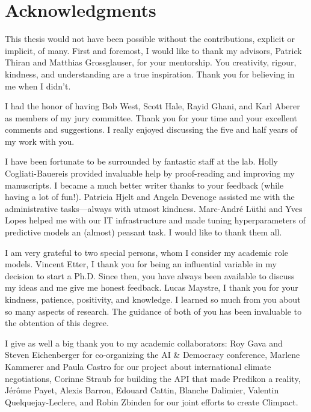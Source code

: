\chapter*{Acknowledgments}

This thesis would not have been possible without the contributions, explicit or implicit, of many.
First and foremost, I would like to thank my advisors, Patrick Thiran and Matthias Grossglauser, for your mentorship.
You creativity, rigour, kindness, and understanding are a true inspiration.
Thank you for believing in me when I didn't.

I had the honor of having Bob West, Scott Hale, Rayid Ghani, and Karl Aberer as members of my jury committee.
Thank you for your time and your excellent comments and suggestions.
I really enjoyed discussing the five and half years of my work with you.

I have been fortunate to be surrounded by fantastic staff at the lab.
Holly Cogliati-Bauereis provided invaluable help by proof-reading and improving my manuscripts.
I became a much better writer thanks to your feedback (while having a lot of fun!).
Patricia Hjelt and Angela Devenoge assisted me with the administrative tasks---always with utmost kindness.
Marc-André Lüthi and Yves Lopes helped me with our IT infrastructure and made tuning hyperparameters of predictive models an (almost) peasant task.
I would like to thank them all.

I am very grateful to two special persons, whom I consider my academic role models.
Vincent Etter, I thank you for being an influential variable in my decision to start a Ph.D.
Since then, you have always been available to discuss my ideas and me give me honest feedback.
Lucas Maystre, I thank you for your kindness, patience, positivity, and knowledge.
I learned so much from you about so many aspects of research.
The guidance of both of you has been invaluable to the obtention of this degree.

I give as well a big thank you to my academic collaborators:
Roy Gava and Steven Eichenberger for co-organizing the AI \& Democracy conference, Marlene Kammerer and Paula Castro for our project about international climate negotiations, Corinne Straub for building the API that made Predikon a reality, Jérôme Payet, Alexis Barrou, Edouard Cattin, Blanche Dalimier, Valentin Quelquejay-Leclere, and Robin Zbinden for our joint efforts to create Climpact.

